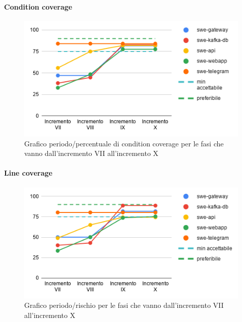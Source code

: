 \paragraph{Condition coverage}
\begin{figure}[H]
			\centering
			\includegraphics[width=0.8\linewidth]{./res/images/QM-TEST-2-CONCO.png}
			\caption{Grafico periodo/percentuale di condition coverage per le fasi che vanno dall'incremento VII all'incremento X}
			\label{fig:Grafico periodo/percentuale di condition coverage per le fasi che vanno dall'incremento VII all'incremento X}
	\end{figure}
\paragraph{Line coverage}
\begin{figure}[H]
			\centering
			\includegraphics[width=0.8\linewidth]{./res/images/QM-TEST-3-LOCO.png}
			\caption{Grafico periodo/rischio per le fasi che vanno dall'incremento VII all'incremento X}
			\label{fig:Grafico periodo/rischio per le fasi che vanno dall'incremento VII all'incremento X}
	\end{figure}
